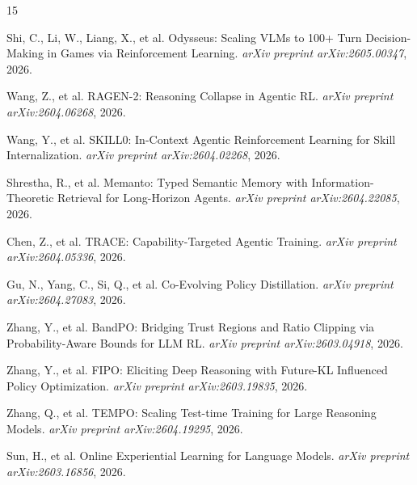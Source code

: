 \documentclass[11pt]{article}
\begin{document}
\begin{thebibliography}{15}

Shi, C., Li, W., Liang, X., et al.
\newblock Odysseus: Scaling VLMs to 100+ Turn Decision-Making in Games via Reinforcement Learning.
\newblock \emph{arXiv preprint arXiv:2605.00347}, 2026.

Wang, Z., et al.
\newblock RAGEN-2: Reasoning Collapse in Agentic RL.
\newblock \emph{arXiv preprint arXiv:2604.06268}, 2026.

Wang, Y., et al.
\newblock SKILL0: In-Context Agentic Reinforcement Learning for Skill Internalization.
\newblock \emph{arXiv preprint arXiv:2604.02268}, 2026.

Shrestha, R., et al.
\newblock Memanto: Typed Semantic Memory with Information-Theoretic Retrieval for Long-Horizon Agents.
\newblock \emph{arXiv preprint arXiv:2604.22085}, 2026.

Chen, Z., et al.
\newblock TRACE: Capability-Targeted Agentic Training.
\newblock \emph{arXiv preprint arXiv:2604.05336}, 2026.

Gu, N., Yang, C., Si, Q., et al.
\newblock Co-Evolving Policy Distillation.
\newblock \emph{arXiv preprint arXiv:2604.27083}, 2026.

Zhang, Y., et al.
\newblock BandPO: Bridging Trust Regions and Ratio Clipping via Probability-Aware Bounds for LLM RL.
\newblock \emph{arXiv preprint arXiv:2603.04918}, 2026.

Zhang, Y., et al.
\newblock FIPO: Eliciting Deep Reasoning with Future-KL Influenced Policy Optimization.
\newblock \emph{arXiv preprint arXiv:2603.19835}, 2026.

Zhang, Q., et al.
\newblock TEMPO: Scaling Test-time Training for Large Reasoning Models.
\newblock \emph{arXiv preprint arXiv:2604.19295}, 2026.

Sun, H., et al.
\newblock Online Experiential Learning for Language Models.
\newblock \emph{arXiv preprint arXiv:2603.16856}, 2026.

\end{thebibliography}
\end{document}
